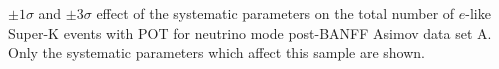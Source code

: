 \begin{table}	
	\begin{adjustbox}{width=\textwidth, totalheight=\textheight, keepaspectratio}
		
	\end{adjustbox}
	\caption
	{
		$\pm1\sigma$ and $\pm3\sigma$ effect of the systematic parameters on the total number of $e$-like Super-K events with \RunPeriod POT for neutrino mode post-BANFF Asimov data set A. Only the systematic parameters which affect this sample are shown.
	}
\end{table}\clearpage